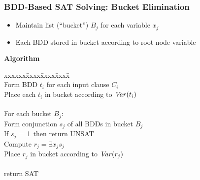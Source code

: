 \documentclass[t,pdf]{beamer}
\begin{document}
\begin{frame}

  \frametitle{BDD-Based SAT Solving: Bucket Elimination}

  \begin{itemize}
     \item Maintain list (``bucket'') $B_j$ for each variable $x_j$
     \item Each BDD stored in bucket according to root node variable
  \end{itemize}

{\bf Algorithm}
   \begin{tabbing}
     xxxxxx\=xxxx\=xxxx\=xxxx\=\kill
      \\
    \>\>Form BDD $t_i$ for each input clause $C_i$ \\
    \>\>Place each $t_i$ in bucket according to ${\it Var}(t_i)$ \\
\\
  \>For each bucket $B_j$: \\
    \>\>Form conjunction $s_j$ of all BDDs in bucket $B_j$ \\
    \>\>If $s_j = \bot$ then return UNSAT \\
    \>\>Compute $r_j = \exists x_j s_j$ \\
    \>\>Place $r_j$ in bucket according to ${\it Var}(r_j)$ \\
\\
  \>return SAT \\
  \end{tabbing}


\end{frame}
\end{document}
